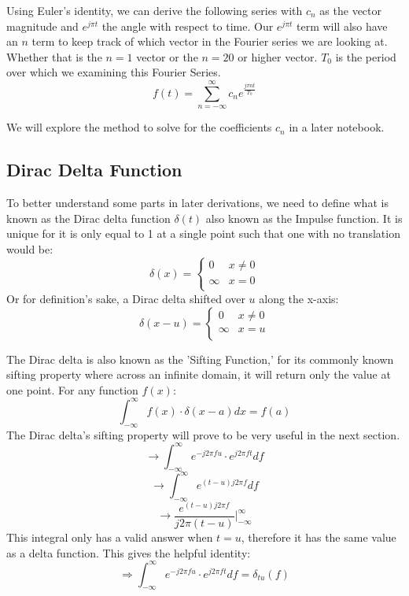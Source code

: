 \documentclass[12pt]{article}
\begin{document}
Using Euler's identity, we can derive the following series with $c_n$ as the vector magnitude and $e^{j\pi t}$ the angle with respect to time. Our $e^{j\pi t}$ term will also have an $n$ term to keep track of which vector in the Fourier series we are looking at. Whether that is the $n=1$ vector or the $n=20$ or higher vector. $T_0$ is the period over which we examining this Fourier Series.
$$ f(t) = \sum_{n=-\infty}^{\infty} c_n e^{\frac{j\pi nt}{T_0}} $$ 

We will explore the method to solve for the coefficients $c_n$ in a later notebook.

\subsection{Dirac Delta Function}
To better understand some parts in later derivations, we need to define what is known as the Dirac delta function $\delta(t)$ also known as the Impulse function. It is unique for it is only equal to 1 at a single point such that one with no translation would be: $$ \delta (x) = \begin{cases} 
      0 & x \neq 0 \\
      \infty & x = 0 \\
   \end{cases} $$ Or for definition's sake, a Dirac delta shifted over $u$ along the x-axis: $$ \delta (x-u) = \begin{cases} 
      0 & x \neq 0 \\
      \infty & x = u \\
   \end{cases} $$
   
The Dirac delta is also known as the 'Sifting Function,' for its commonly known sifting property where across an infinite domain, it will return only the value at one point. For any function $f(x)$: $$ \int_{-\infty}^{\infty} f(x) \cdot \delta(x-a)dx = f(a) $$ 
The Dirac delta's sifting property will prove to be very useful in the next section. 
 $$\rightarrow \int_{-\infty}^{\infty} e^{-j2\pi fu} \cdot e^{j2\pi ft} df $$ 
 $$ \rightarrow \int_{-\infty}^{\infty} e^{(t-u)j2\pi f} df $$ $$ \rightarrow \frac{e^{(t-u)j2\pi f}}{j2\pi (t-u)} \bigg\rvert_{-\infty}^{\infty} $$ This integral only has a valid answer when $t=u$, therefore it has the same value as a delta function. This gives the helpful identity: $$\Rightarrow \int_{-\infty}^{\infty} e^{-j2\pi fu} \cdot e^{j2\pi ft} df = \delta_{tu}(f) $$
\end{document}
